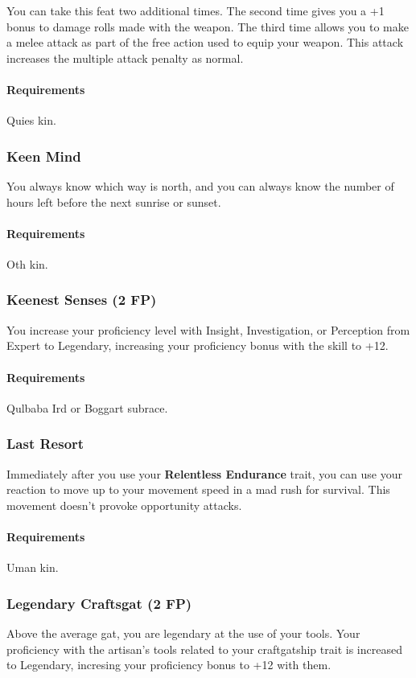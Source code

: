     You can take this feat two additional times.
    The second time gives you a +1 bonus to damage rolls made with the weapon.
    The third time allows you to make a melee attack as part of the free action used to equip your weapon.
    This attack increases the multiple attack penalty as normal.
    \paragraph{Requirements} Quies kin.
\subsubsection{Keen Mind} \label{feat::keenmind}
    You always know which way is north, and you can always know the number of hours left before the next sunrise or sunset.
    \paragraph{Requirements} Oth kin.
\subsubsection{Keenest Senses (2 FP)} \label{feat::keenestsenses}
    You increase your proficiency level with Insight, Investigation, or Perception from Expert to Legendary, increasing your proficiency bonus with the skill to +12.
    \paragraph{Requirements} Qulbaba Ird or Boggart subrace.
\subsubsection{Last Resort} \label{feat::lastresort}
    Immediately after you use your \textbf{Relentless Endurance} trait, you can use your reaction to move up to your movement speed in a mad rush for survival.
    This movement doesn't provoke opportunity attacks.
    \paragraph{Requirements} Uman kin.
\subsubsection{Legendary Craftsgat (2 FP)} \label{feat::legendarycraftsgat}
    Above the average gat, you are legendary at the use of your tools.
    Your proficiency with the artisan's tools related to your craftgatship trait is increased to Legendary, incresing your proficiency bonus to +12 with them.
